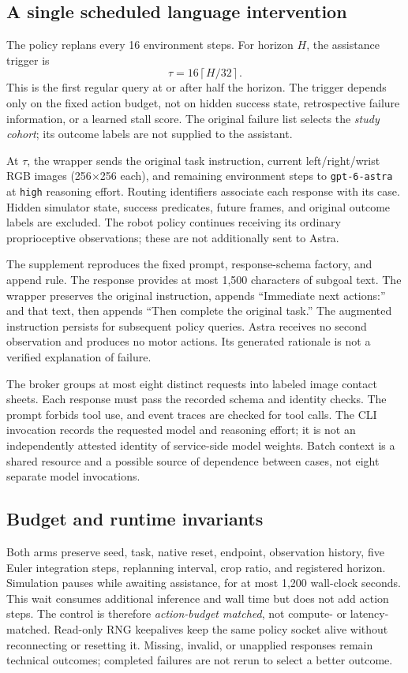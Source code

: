 \documentclass[10pt,twocolumn,letterpaper]{article}
\begin{document}
\subsection{A single scheduled language intervention}
The policy replans every 16 environment steps. For horizon $H$, the assistance trigger is
\begin{equation}
\tau=16\left\lceil H/32\right\rceil.
\label{eq:trigger}
\end{equation}
This is the first regular query at or after half the horizon. The trigger depends only on the fixed action budget, not on hidden success state, retrospective failure information, or a learned stall score. The original failure list selects the \emph{study cohort}; its outcome labels are not supplied to the assistant.

At $\tau$, the wrapper sends the original task instruction, current left/right/wrist RGB images (256$\times$256 each), and remaining environment steps to \texttt{gpt-6-astra} at \texttt{high} reasoning effort. Routing identifiers associate each response with its case. Hidden simulator state, success predicates, future frames, and original outcome labels are excluded. The robot policy continues receiving its ordinary proprioceptive observations; these are not additionally sent to Astra.

The supplement reproduces the fixed prompt, response-schema factory, and append rule. The response provides at most 1,500 characters of subgoal text. The wrapper preserves the original instruction, appends ``Immediate next actions:'' and that text, then appends ``Then complete the original task.'' The augmented instruction persists for subsequent policy queries. Astra receives no second observation and produces no motor actions. Its generated rationale is not a verified explanation of failure.

The broker groups at most eight distinct requests into labeled image contact sheets. Each response must pass the recorded schema and identity checks. The prompt forbids tool use, and event traces are checked for tool calls. The CLI invocation records the requested model and reasoning effort; it is not an independently attested identity of service-side model weights. Batch context is a shared resource and a possible source of dependence between cases, not eight separate model invocations.

\subsection{Budget and runtime invariants}
Both arms preserve seed, task, native reset, endpoint, observation history, five Euler integration steps, replanning interval, crop ratio, and registered horizon. Simulation pauses while awaiting assistance, for at most 1,200 wall-clock seconds. This wait consumes additional inference and wall time but does not add action steps. The control is therefore \emph{action-budget matched}, not compute- or latency-matched. Read-only RNG keepalives keep the same policy socket alive without reconnecting or resetting it. Missing, invalid, or unapplied responses remain technical outcomes; completed failures are not rerun to select a better outcome.
\end{document}
